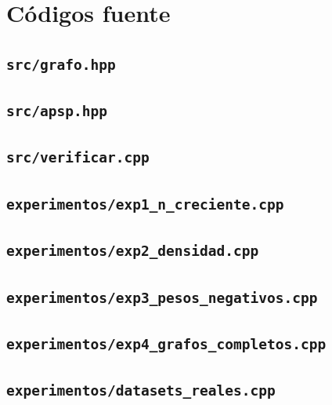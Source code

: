 \documentclass[11pt]{article}
\begin{document}
\pagebreak
\appendix
\section{Códigos fuente}

\subsection{\texttt{src/grafo.hpp}}\label{app:grafo}


\subsection{\texttt{src/apsp.hpp}}\label{app:apsp}

\pagebreak
\subsection{\texttt{src/verificar.cpp}}\label{app:verificar}


\subsection{\texttt{experimentos/exp1\_n\_creciente.cpp}}\label{app:exp1}


\subsection{\texttt{experimentos/exp2\_densidad.cpp}}\label{app:exp2}

\pagebreak
\subsection{\texttt{experimentos/exp3\_pesos\_negativos.cpp}}\label{app:exp3}


\subsection{\texttt{experimentos/exp4\_grafos\_completos.cpp}}\label{app:exp4}


\subsection{\texttt{experimentos/datasets\_reales.cpp}}\label{app:datasets}

\end{document}
